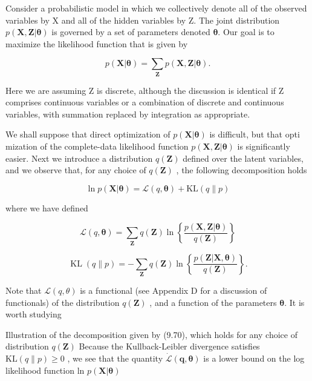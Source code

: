 \documentclass[
  10
]{article}
\begin{document}
Consider a probabilistic model in which we collectively denote all of
the observed variables by X and all of the hidden variables by Z. The
joint distribution
\(p ( \mathbf { X } , \mathbf { Z } | \boldsymbol { \theta } )\) is
governed by a set of parameters denoted \(\pmb { \theta } .\) Our goal
is to maximize the likelihood function that is given by

\[
p (\mathbf {X} | \boldsymbol {\theta}) = \sum_ {\mathbf {Z}} p (\mathbf {X}, \mathbf {Z} | \boldsymbol {\theta}).\tag{9.69}
\]

Here we are assuming Z is discrete, although the discussion is identical
if Z comprises continuous variables or a combination of discrete and
continuous variables, with summation replaced by integration as
appropriate.

We shall suppose that direct optimization of
\(p ( \mathbf { X } | \pmb { \theta } )\) is difficult, but that opti
mization of the complete-data likelihood function
\(p ( \mathbf { X } , \mathbf { Z } | \boldsymbol { \theta } )\) is
significantly easier. Next we introduce a distribution
\(q ( \mathbf { Z } )\) defined over the latent variables, and we
observe that, for any choice of \(q ( \mathbf { Z } )\) , the following
decomposition holds

\[
\ln p (\mathbf {X} | \boldsymbol {\theta}) = \mathcal {L} (q, \boldsymbol {\theta}) + \mathrm{KL} (q \| p)\tag{9.70}
\]

where we have defined

\[
\mathcal {L} (q, \pmb {\theta}) = \sum_ {\mathbf {Z}} q (\mathbf {Z}) \ln \left\{\frac {p (\mathbf {X} , \mathbf {Z} | \pmb {\theta})}{q (\mathbf {Z})} \right\}\tag{9.71}
\]

\[
\operatorname{KL} (q \| p) = - \sum_ {\mathbf {Z}} q (\mathbf {Z}) \ln \left\{\frac {p (\mathbf {Z} | \mathbf {X} , \boldsymbol {\theta})}{q (\mathbf {Z})} \right\}.\tag{9.72}
\]

Note that \(\mathcal { L } ( q , \theta )\) is a functional (see
Appendix D for a discussion of functionals) of the distribution
\(q ( \mathbf { Z } )\) , and a function of the parameters
\(\pmb { \theta } .\) It is worth studying

Illustration of the decomposition given by (9.70), which holds for any
choice of distribution \(q ( \mathbf { Z } )\) Because the
Kullback-Leibler divergence satisfies
\(\mathrm { K L } ( q \| p ) \geqslant 0\) , we see that the quantity
\(\dot { \mathcal { L } } ( \boldsymbol { q } , \boldsymbol { \theta } )\)
is a lower bound on the log likelihood function ln
\(p ( \mathbf { X } | \pmb { \theta } )\)
\end{document}
